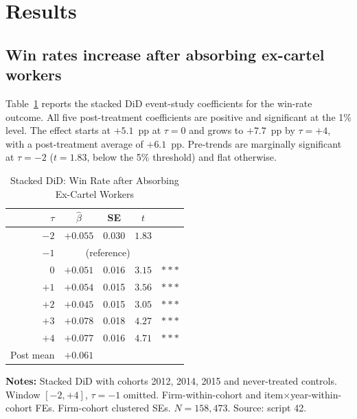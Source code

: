 \section{Results}\label{sec:results}

\subsection{Win rates increase after absorbing ex-cartel workers}

Table~\ref{tab:main} reports the stacked DiD event-study coefficients for the win-rate outcome. All five post-treatment coefficients are positive and significant at the 1\% level. The effect starts at $+5.1$~pp at $\tau = 0$ and grows to $+7.7$~pp by $\tau = +4$, with a post-treatment average of $+6.1$~pp. Pre-trends are marginally significant at $\tau = -2$ ($t = 1.83$, below the 5\% threshold) and flat otherwise.

\begin{table}[htbp]
\centering
\caption{Stacked DiD: Win Rate after Absorbing Ex-Cartel Workers}\label{tab:main}
\begin{tabular}{rcccc}
\toprule
$\tau$ & $\hat{\beta}$ & SE & $t$ & \\
\midrule
$-2$ & $+0.055$ & 0.030 & $1.83$ & \\
$-1$ & \multicolumn{3}{c}{(reference)} & \\
$0$ & $+0.051$ & 0.016 & $3.15$ & $***$ \\
$+1$ & $+0.054$ & 0.015 & $3.56$ & $***$ \\
$+2$ & $+0.045$ & 0.015 & $3.05$ & $***$ \\
$+3$ & $+0.078$ & 0.018 & $4.27$ & $***$ \\
$+4$ & $+0.077$ & 0.016 & $4.71$ & $***$ \\
\midrule
Post mean & $+0.061$ & & & \\
\bottomrule
\end{tabular}
\vspace{0.5em}
\begin{minipage}{0.90\textwidth}
\scriptsize{\textbf{Notes:} Stacked DiD with cohorts 2012, 2014, 2015 and never-treated controls. Window $[-2, +4]$, $\tau = -1$ omitted. Firm-within-cohort and item$\times$year-within-cohort FEs. Firm-cohort clustered SEs. $N = 158{,}473$. Source: script 42.\par}
\end{minipage}
\end{table}

